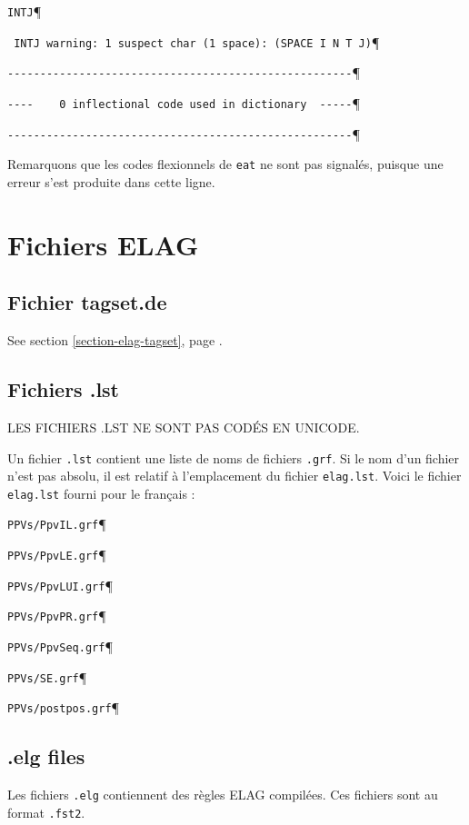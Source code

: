 \verb$INTJ$\P

\verb$ INTJ warning: 1 suspect char (1 space): (SPACE I N T J)$\P

\verb$-----------------------------------------------------$\P

\verb$----    0 inflectional code used in dictionary  -----$\P

\verb$-----------------------------------------------------$\P

\bigskip
\noindent Remarquons que les codes flexionnels de \verb+eat+ ne sont pas signalés, puisque
une erreur s'est produite dans cette ligne.


\section{Fichiers ELAG}
\subsection{Fichier tagset.de}
See section \ref{section-elag-tagset}, page \pageref{section-elag-tagset}.

\subsection{Fichiers .lst}

LES FICHIERS .LST NE SONT PAS CODÉS EN UNICODE.

\bigskip
\noindent Un fichier \verb$.lst$ contient une liste de noms de fichiers \verb$.grf$. Si
le nom d'un fichier n'est pas absolu, il est relatif à l'emplacement du fichier
\verb$elag.lst$. Voici le fichier \verb$elag.lst$ fourni pour le français :


\bigskip
\verb$PPVs/PpvIL.grf$\P

\verb$PPVs/PpvLE.grf$\P

\verb$PPVs/PpvLUI.grf$\P

\verb$PPVs/PpvPR.grf$\P

\verb$PPVs/PpvSeq.grf$\P

\verb$PPVs/SE.grf$\P

\verb$PPVs/postpos.grf$\P

\subsection{.elg files}

Les fichiers \verb$.elg$ contiennent des règles ELAG compilées. Ces fichiers sont au format \verb$.fst2$.


